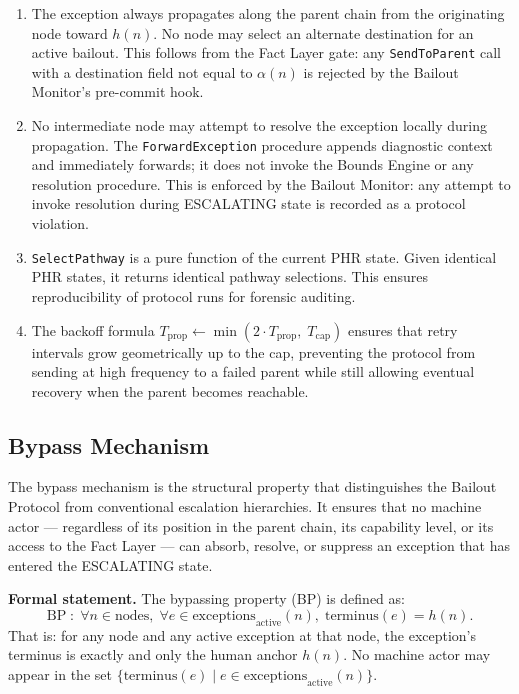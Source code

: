 \begin{enumerate}\itemsep=0pt
\item[\textbf{P1 (Path integrity).}] The exception always propagates along the parent chain from the originating node toward $h(n)$. No node may select an alternate destination for an active bailout. This follows from the Fact Layer gate: any \texttt{SendToParent} call with a destination field not equal to $\alpha(n)$ is rejected by the Bailout Monitor's pre-commit hook.

\item[\textbf{P2 (No local absorption).}] No intermediate node may attempt to resolve the exception locally during propagation. The \texttt{ForwardException} procedure appends diagnostic context and immediately forwards; it does not invoke the Bounds Engine or any resolution procedure. This is enforced by the Bailout Monitor: any attempt to invoke resolution during ESCALATING state is recorded as a protocol violation.

\item[\textbf{P3 (Deterministic pathway selection).}] \texttt{SelectPathway} is a pure function of the current PHR state. Given identical PHR states, it returns identical pathway selections. This ensures reproducibility of protocol runs for forensic auditing.

\item[\textbf{P4 (Exponential backoff with cap).}] The backoff formula $T_{\text{prop}} \leftarrow \min(2 \cdot T_{\text{prop}},\; T_{\text{cap}})$ ensures that retry intervals grow geometrically up to the cap, preventing the protocol from sending at high frequency to a failed parent while still allowing eventual recovery when the parent becomes reachable.
\end{enumerate}

\subsection{Bypass Mechanism}
\label{sec:bypass}

The bypass mechanism is the structural property that distinguishes the Bailout Protocol from conventional escalation hierarchies. It ensures that no machine actor — regardless of its position in the parent chain, its capability level, or its access to the Fact Layer — can absorb, resolve, or suppress an exception that has entered the ESCALATING state.

\bigskip
\noindent\textbf{Formal statement.} The bypassing property (BP) is defined as:
\begin{equation}
\text{BP} \;:\; \forall n \in \text{nodes},\; \forall e \in \text{exceptions}_{\text{active}}(n),\; \text{terminus}(e) = h(n). \tag{BP}
\end{equation}
That is: for any node and any active exception at that node, the exception's terminus is exactly and only the human anchor $h(n)$. No machine actor may appear in the set $\{ \text{terminus}(e) \mid e \in \text{exceptions}_{\text{active}}(n) \}$.


